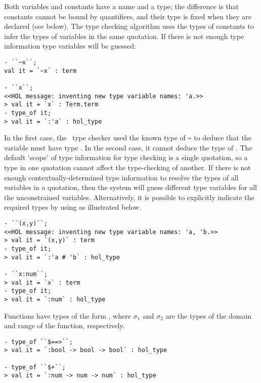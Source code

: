Both variables and constants have a name and a type; the difference is
that constants cannot be bound by quantifiers, and their type is fixed
when they are declared (see below). The type checking algorithm uses
the types of constants to infer the types of variables in the same
quotation. If there is not enough type information type variables will
be guessed:

\begin{session}\begin{verbatim}
- ``~x``;
val it = `~x` : term

- ``x``;
<<HOL message: inventing new type variable names: 'a.>>
> val it = `x` : Term.term
- type_of it;
> val it = `:'a` : hol_type
\end{verbatim}\end{session}

    In the first case, the \HOL\ type checker used the known type
     of {\small\verb|~|} to deduce that the variable
     must have type .  In the second case, it cannot
    deduce the type of .  The default `scope' of type
    information for type checking is a single quotation, so a type in
    one quotation cannot affect the type-checking of another.  If
    there is not enough contextually-determined type information to
    resolve the types of all variables in a quotation, then the system
    will guess different type variables for all the unconstrained
    variables.  Alternatively, it is possible to explicitly indicate
    the required types by using  as illustrated
    below.

\begin{session}\begin{verbatim}
- ``(x,y)``;
<<HOL message: inventing new type variable names: 'a, 'b.>>
> val it = `(x,y)` : term
- type_of it;
> val it = `:'a # 'b` : hol_type

- ``x:num``;
> val it = `x` : term
- type_of it;
> val it = `:num` : hol_type
\end{verbatim}\end{session}

    Functions have types of the form ,
    where $\sigma_1$ and $\sigma_2$ are the types of the domain and
    range of the function, respectively.

\begin{session}\begin{verbatim}
- type_of ``$==>``;
> val it = `:bool -> bool -> bool` : hol_type

- type_of ``$+``;
> val it = `:num -> num -> num` : hol_type
\end{verbatim}\end{session}

